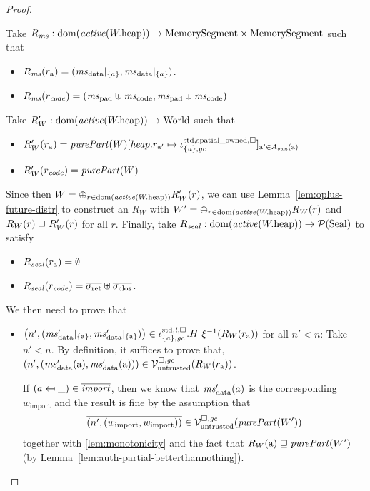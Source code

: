 \documentclass[a4paper]{article}
\begin{document}
\begin{proof}
\begin{itemize}
   Take $R_\ms : \dom(\activeReg{\pwheap}) \fun \MemSeg \times \MemSeg$ such that
    \begin{itemize}
    \item $R_\ms(r_\addr) = (\msdata|_{\{a\}}, \msdata|_{\{a\}})$.
    \item $R_\ms(r_\var{code}) = (\mspad\uplus\mscode,\mspad\uplus\mscode)$
    \end{itemize}
    Take $R_W' : \dom(\activeReg{\pwheap}) \fun \World$ such that
    \begin{itemize}
    \item $R_W'(r_\addr) = \purePart{W}[\var{heap}.r_{\addr'}\mapsto \stdreg{\{\aaddr\},\gc}{\spatialo}]_{\addr' \in A_\var{own}(\addr)}$ 
    \item $R_W'(r_\var{code}) = \purePart{W}$
    \end{itemize}
    Since then $W = \oplus_{r \in \dom(\activeReg{\pwheap})} R_W'(r)$, we can use Lemma~\ref{lem:oplus-future-distr} to construct an $R_W$ with  $W' = \oplus_{r \in \dom(\activeReg{\pwheap})} R_W(r)$ and $R_W(r) \sqsupseteq R_W'(r)$ for all $r$.
    Finally, take $R_\var{seal} : \dom(\activeReg{\pwheap}) \fun \powerset{\Seal}$ to satisfy
    \begin{itemize}
    \item $R_{\mathit{seal}}(r_{\mathrm{a}}) = \emptyset$
    \item $R_\var{seal}(r_\var{code}) = \sigrets\uplus \sigcloss$.
    \end{itemize}

    We then need to prove that 
    \begin{itemize}
    \item $\npair[n']{(\msdata'|_{\{\addr\}},\msdata'|_{\{\addr\}})} \in \stdreg{\{\aaddr\},\gc}{\lin}.H~ \xi^{-1}(R_W(r_\addr))$ for all $n' < n$:
      Take $n' < n$.
      By definition, it suffices to prove that,
      $\npair[n']{(\msdata'(\addr),\msdata'(\addr))} \in \lrv(R_W(r_\addr))$.

      If $(a \mapsfrom \_) \in \overline{\mathit{import}}$, then we know that $\msdata'(a)$ is the corresponding $w_{\mathrm{import}}$ and the result is fine by the assumption that
      \begin{equation*}
        \overline{\npair[n']{(w_{\mathrm{import}},w_{\mathrm{import}})}} \in \lrv(\purePart{W'})
      \end{equation*}
      together with \ref{lem:monotonicity} and the fact that $R_W(\addr) \future \purePart{W'}$ (by Lemma~\ref{lem:auth-partial-betterthannothing}).


\end{itemize}
\end{itemize}
\end{proof}
\end{document}
